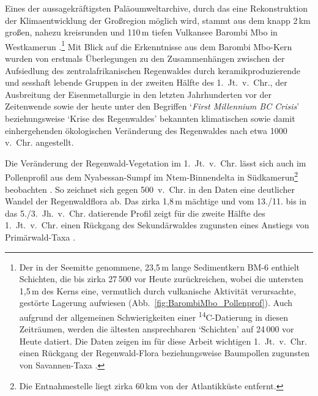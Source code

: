 Eines der aussagekräftigsten Paläoumweltarchive, durch das eine Rekonstruktion der Klimaentwicklung der Großregion möglich wird, stammt aus dem knapp 2\,km großen, nahezu kreisrunden und 110\,m tiefen Vulkansee Barombi Mbo in Westkamerun \parencite[159--161]{Maley.1998b}.\footnote{Der in der Seemitte genommene, 23,5\,m lange Sedimentkern BM-6 enthielt Schichten, die bis zirka 27\,500 vor Heute zurückreichen, wobei die untersten 1,5\,m des Kerns eine, vermutlich durch vulkanische Aktivität verursachte, gestörte Lagerung aufwiesen (Abb.~\ref{fig:BarombiMbo_Pollenprof}). Auch aufgrund der allgemeinen Schwierigkeiten einer \textsuperscript{14}C-Datierung in diesen Zeiträumen, werden die ältesten ansprechbaren \enquote*{Schichten} auf 24\,000 vor Heute datiert. Die Daten zeigen im für diese Arbeit wichtigen 1.~Jt.~v.~Chr. einen Rückgang der Regenwald-Flora beziehungsweise Baumpollen zugunsten von Savannen-Taxa  \parencite[\textit{Pl. Hygrophiles},][siehe Abb.~\ref{fig:BarombiMbo_Pollenprof}]{Maley.2003}.} Mit Blick auf die Erkenntnisse aus dem Barombi Mbo-Kern wurden von \textcite[357--360]{Schwartz.1992} erstmals Überlegungen zu den Zusammenhängen zwischen der Aufsiedlung des zentralafrikanischen Regenwaldes durch keramikproduzierende und sesshaft lebende Gruppen in der zweiten Hälfte des 1.~Jt.~v.~Chr., der Ausbreitung der Eisenmetallurgie in den letzten Jahrhunderten vor der Zeitenwende sowie der heute unter den Begriffen \enquote*{\textit{First Millennium BC Crisis}} \parencite[63]{Sangen.2009} beziehungsweise \enquote*{Krise des Regenwaldes} \parencite{Neumann.2014} bekannten klimatischen sowie damit einhergehenden ökologischen Veränderung des Regenwaldes nach etwa 1000 v.~Chr. angestellt.

Die Veränderung der Regenwald-Vegetation im 1.~Jt.~v.~Chr. lässt sich auch im Pollenprofil aus dem Nyabessan-Sumpf im Ntem-Binnendelta in Südkamerun\footnote{Die Entnahmestelle liegt zirka 60\,km von der Atlantikküste entfernt.} beobachten \parencite[316]{Ngomanda.2009}. So zeichnet sich gegen 500~v.~Chr. in den Daten eine deutlicher Wandel der Regenwaldflora ab. Das zirka 1,8\,m mächtige und vom 13./11. bis in das 5./3.~Jh.~v.~Chr. datierende Profil zeigt für die zweite Hälfte des 1.~Jt.~v.~Chr. einen Rückgang des Sekundärwaldes zugunsten eines Anstiegs von Primärwald-Taxa \parencite[ebd. 311 Abb.~3; ][58 Abb.~5]{Neumann.2012}.

